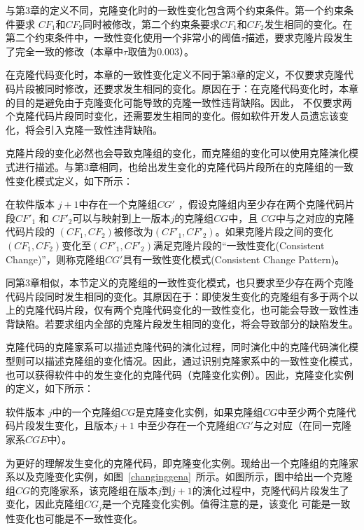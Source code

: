 与第3章的定义不同，克隆变化时的一致性变化包含两个约束条件。第一个约束条件要求 $CF_1 $和$CF_2 $同时被修改，第二个约束条要求$CF_1 $和$CF_2$发生相同的变化。在第二个约束条件中，一致性变化使用一个非常小的阈值$\tau$描述，要求克隆片段发生了完全一致的修改（本章中$\tau$取值为$0.003$）。

在克隆代码变化时，本章的一致性变化定义不同于第3章的定义，不仅要求克隆代码片段被同时修改，还要求发生相同的变化。原因在于：在克隆代码变化时，本章的目的是避免由于克隆变化可能导致的克隆一致性违背缺陷。因此， 不仅要求两个克隆代码片段同时变化，还需要发生相同的变化。假如软件开发人员遗忘该变化，将会引入克隆一致性违背缺陷。

克隆片段的变化必然也会导致克隆组的变化，而克隆组的变化可以使用克隆演化模式进行描述。与第3章相同，也给出发生变化的克隆代码片段所在的克隆组的一致性变化模式定义，如下所示：

\begin{definition}[克隆变化一致性模式] 
\label{def-changingpattern}
在软件版本 $j+1$中存在一个克隆组$CG'$ ，假设克隆组内至少存在两个克隆代码片段$CF'_1$ 和 $CF'_2$可以与映射到上一版本$j$的克隆组$CG$中，且 $CG$中与之对应的克隆代码片段的 $(CF_1,CF_2)$被修改为$(CF'_1,CF'_2)$。如果克隆片段之间的变化$(CF_1,CF_2)$变化至$(CF'_1,CF'_2)$满足克隆片段的“一致性变化(Consistent Change)”，则称克隆组$CG'$具有一致性变化模式(Consistent Change Pattern)。
\end{definition}

同第3章相似，本节定义的克隆组的一致性变化模式，也只要求至少存在两个克隆代码片段同时发生相同的变化。其原因在于：即使发生变化的克隆组有多于两个以上的克隆代码片段，仅有两个克隆代码变化的一致性变化，也可能会导致一致性违背缺陷。若要求组内全部的克隆片段发生相同的变化，将会导致部分的缺陷发生。

克隆代码的克隆家系可以描述克隆代码的演化过程，同时演化中的克隆代码演化模型则可以描述克隆组的变化情况。因此，通过识别克隆家系中的一致性变化模式，也可以获得软件中的发生变化的克隆代码（克隆变化实例）。因此，克隆变化实例的定义，如下所示：

\begin{definition}[克隆变化实例] 
\label{def-changinginstance}
软件版本 $j$中的一个克隆组$CG$是克隆变化实例，如果克隆组$CG$中至少两个克隆代码片段发生变化，且版本$j+1$ 中至少存在一个克隆组$CG'$与之对应（在同一克隆家系$CGE$中）。 
\end{definition}

为更好的理解发生变化的克隆代码，即克隆变化实例。现给出一个克隆组的克隆家系以及克隆变化实例，如图~\ref{changinggena}~所示。如图所示，图中给出一个克隆组$CG$的克隆家系，该克隆组在版本$j$到$j+1$的演化过程中，克隆代码片段发生了变化，因此克隆组$CG_j$是一个克隆变化实例。值得注意的是，该变化 可能是一致性变化也可能是不一致性变化。

